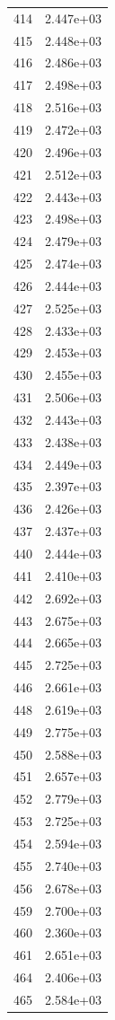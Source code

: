 \documentclass[12pt]{article}
\begin{document}
\begin{longtable}{@{}cc@{}}
414 & 2.447e+03 \\
415 & 2.448e+03 \\
416 & 2.486e+03 \\
417 & 2.498e+03 \\
418 & 2.516e+03 \\
419 & 2.472e+03 \\
420 & 2.496e+03 \\
421 & 2.512e+03 \\
422 & 2.443e+03 \\
423 & 2.498e+03 \\
424 & 2.479e+03 \\
425 & 2.474e+03 \\
426 & 2.444e+03 \\
427 & 2.525e+03 \\
428 & 2.433e+03 \\
429 & 2.453e+03 \\
430 & 2.455e+03 \\
431 & 2.506e+03 \\
432 & 2.443e+03 \\
433 & 2.438e+03 \\
434 & 2.449e+03 \\
435 & 2.397e+03 \\
436 & 2.426e+03 \\
437 & 2.437e+03 \\
440 & 2.444e+03 \\
441 & 2.410e+03 \\
442 & 2.692e+03 \\
443 & 2.675e+03 \\
444 & 2.665e+03 \\
445 & 2.725e+03 \\
446 & 2.661e+03 \\
448 & 2.619e+03 \\
449 & 2.775e+03 \\
450 & 2.588e+03 \\
451 & 2.657e+03 \\
452 & 2.779e+03 \\
453 & 2.725e+03 \\
454 & 2.594e+03 \\
455 & 2.740e+03 \\
456 & 2.678e+03 \\
459 & 2.700e+03 \\
460 & 2.360e+03 \\
461 & 2.651e+03 \\
464 & 2.406e+03 \\
465 & 2.584e+03 \\

\end{longtable}
\end{document}
